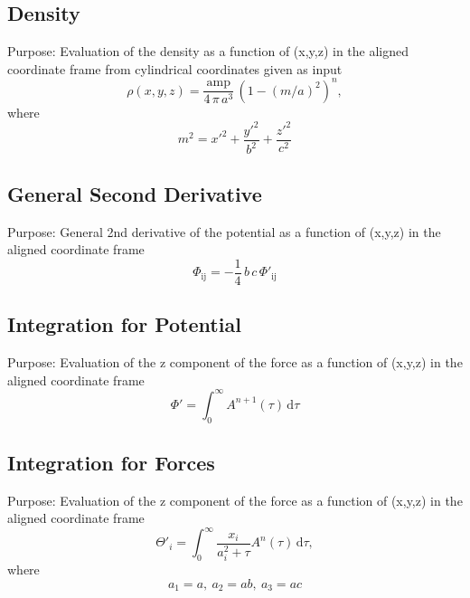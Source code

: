 \documentclass[a4paper,11pt]{article}
\begin{document}
		
		\subsection{Density} %
			Purpose: Evaluation of the density as a function of (x,y,z) in the aligned coordinate frame from cylindrical coordinates given as input\\
		\begin{equation}
		\rho(x,y,z) = \frac{\mathrm{amp}}{4\,\pi\,a^3}\,(1-(m/a)^2)^n,
		\end{equation}
		where
		\begin{equation}
		m^2 = x'^2 + \frac{y'^2}{b^2}+\frac{z'^2}{c^2}
		\end{equation}
			


		\subsection{General Second Derivative}
			Purpose: General 2nd derivative of the potential as a function of (x,y,z) in the aligned coordinate frame \\
		\begin{equation}
		\Phi_{\mathrm{ij}} = -\frac{1}{4}\,b\,c \,\Phi'_{\mathrm{ij}}	
		\end{equation}
			
			
	
	
		\subsection{Integration for Potential}
			Purpose: Evaluation of the z component of the force as a function of (x,y,z) in the aligned coordinate frame \\
		\begin{equation}
		\Phi' = \int_{0}^{\infty} A^{n+1}(\tau)\,\mathrm{d} \tau
		\end{equation}
			
	
	
		\subsection{Integration for Forces}
			Purpose: Evaluation of the z component of the force as a function of (x,y,z) in the aligned coordinate frame \\
		\begin{equation}
		\Theta'_i = \int_0^{\infty} \frac{x_i}{a_i^2 + \tau} A^{n}(\tau)\,\mathrm{d} \tau,
		\end{equation}
		where
		\begin{equation}
		a_1 = a,~ a_2 = ab,~a_3 = ac
		\end{equation}
		
\end{document}
